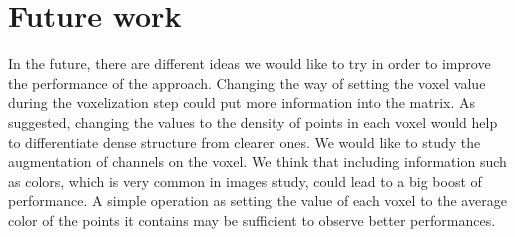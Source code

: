 \section{Future work}
\label{sec:future}

In the future, there are different ideas we would like to try in order to improve the performance of the approach. Changing the way of setting the voxel value during the voxelization step could put more information into the matrix. As suggested, changing the values to the density of points in each voxel would help to differentiate dense structure from clearer ones. We would like to study the augmentation of channels on the voxel. We think that including information such as colors, which is very common in images study, could lead to a big boost of performance. A simple operation as setting the value of each voxel to the average color of the points it contains may be sufficient to observe better performances.
